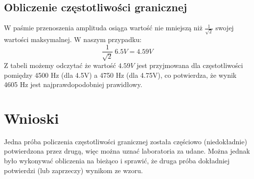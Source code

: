 \documentclass[a4paper,11pt]{article}
\begin{document}
\subsection{Obliczenie częstotliwości granicznej}
W paśmie przenoszenia amplituda osiąga wartość nie mniejszą niż $\frac{1}{\sqrt{2}}$ swojej wartości maksymalnej. W naszym przypadku:
\begin{equation}
 \frac{1}{\sqrt{2}} \ 6.5 V = 4.59V
\end{equation}
Z tabeli możemy odczytać że wartość $4.59 V$ jest przyjmowana dla częstotliwości pomiędzy 4500 Hz (dla 4.5V) a 4750 Hz (dla 4.75V), co potwierdza, że wynik 4605 Hz jest najprawdopodobniej prawidłowy.

\section{Wnioski}
Jedna próba policzenia częstotliwości granicznej została częściowo (niedokładnie) potwierdzona przez drugą, więc można uznać laboratoria za udane. Można jednak było wykonywać obliczenia na bieżąco i sprawić, że druga próba dokładniej potwierdzi (lub zaprzeczy) wynikom ze wzoru.
\end{document}

